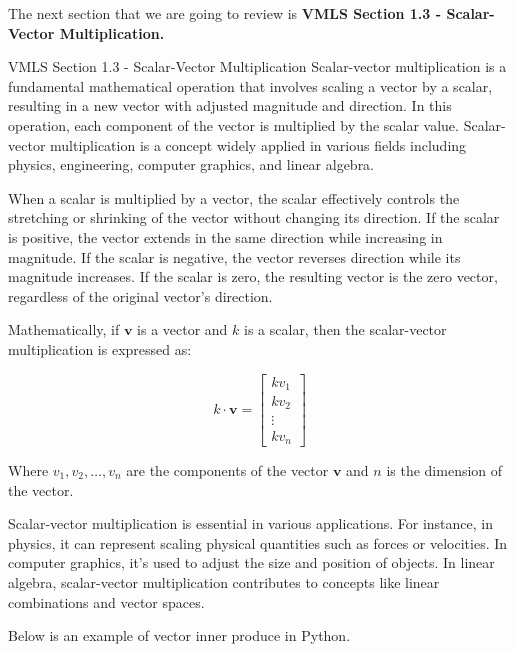 The next section that we are going to review is \textbf{VMLS Section 1.3 - Scalar-Vector Multiplication.}

\begin{notes}{VMLS Section 1.3 - Scalar-Vector Multiplication}
    Scalar-vector multiplication is a fundamental mathematical operation that involves scaling a vector by a scalar, resulting in a new vector with adjusted magnitude and direction. In this operation, each component of 
    the vector is multiplied by the scalar value. Scalar-vector multiplication is a concept widely applied in various fields including physics, engineering, computer graphics, and linear algebra.

    When a scalar is multiplied by a vector, the scalar effectively controls the stretching or shrinking of the vector without changing its direction. If the scalar is positive, the vector extends in the same direction 
    while increasing in magnitude. If the scalar is negative, the vector reverses direction while its magnitude increases. If the scalar is zero, the resulting vector is the zero vector, regardless of the original vector's 
    direction.

    \begin{highlight}
        Mathematically, if \(\mathbf{v}\) is a vector and \(k\) is a scalar, then the scalar-vector multiplication is expressed as:
    
        \[
        k \cdot \mathbf{v} = \begin{bmatrix} kv_1 \\ kv_2 \\ \vdots \\ kv_n \end{bmatrix}
        \]
    
        Where \(v_1, v_2, \ldots, v_n\) are the components of the vector \(\mathbf{v}\) and \(n\) is the dimension of the vector.
    \end{highlight}

    Scalar-vector multiplication is essential in various applications. For instance, in physics, it can represent scaling physical quantities such as forces or velocities. In computer graphics, it's used to adjust the size 
    and position of objects. In linear algebra, scalar-vector multiplication contributes to concepts like linear combinations and vector spaces.

    \begin{highlight}
        Below is an example of vector inner produce in Python.


\end{highlight}
\end{notes}
